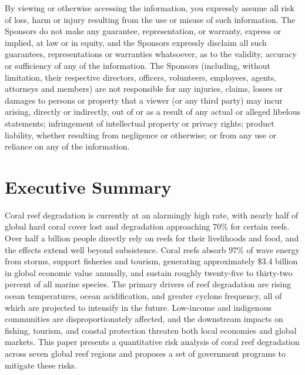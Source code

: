\documentclass[10pt,letterpaper]{article}
\begin{document}
\begin{titlepage}
{\begin{flushleft}
    By viewing or otherwise accessing the information, you expressly assume all risk of loss, harm or injury resulting from the use or misuse of such information. The Sponsors do not make any guarantee, representation, or warranty, express or implied, at law or in equity, and the Sponsors expressly disclaim all such guarantees, representations or warranties whatsoever, as to the validity, accuracy or sufficiency of any of the information. The Sponsors (including, without limitation, their respective directors, officers, volunteers, employees, agents, attorneys and members) are not responsible for any injuries, claims, losses or damages to persons or property that a viewer (or any third party) may incur arising, directly or indirectly, out of or as a result of any actual or alleged libelous statements; infringement of intellectual property or privacy rights; product liability, whether resulting from negligence or otherwise; or from any use or reliance on any of the information.
    \end{flushleft}
    }

\end{titlepage}

\clearpage
{}
\setcounter{page}{1}
\pagestyle{body}

\section*{Executive Summary}

\noindent
\noindent Coral reef degradation is currently at an alarmingly high rate, with nearly half of global hard coral cover lost and degradation approaching 70\% for certain reefs. Over half a billion people directly rely on reefs for their livelihoods and food, and the effects extend well beyond subsistence. Coral reefs absorb 97\% of wave energy from storms, support fisheries and tourism, generating approximately \$3.4 billion in global economic value annually, and sustain roughly twenty-five to thirty-two percent of all marine species. The primary drivers of reef degradation are rising ocean temperatures, ocean acidification, and greater cyclone frequency, all of which are projected to intensify in the future. Low-income and indigenous communities are disproportionately affected, and the downstream impacts on fishing, tourism, and coastal protection threaten both local economies and global markets. This paper presents a quantitative risk analysis of coral reef degradation across seven global reef regions and proposes a set of government programs to mitigate these risks.
\end{document}
